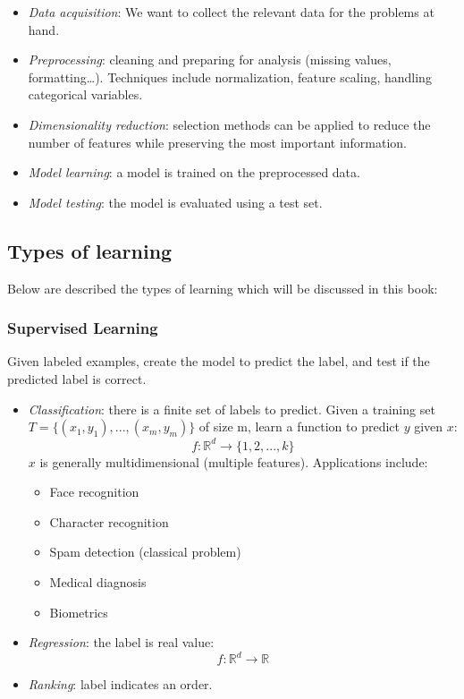 \documentclass[11pt]{article}
\begin{document}
\begin{itemize}
\tightlist
\item
  \emph{Data acquisition}: We want to collect the relevant data for the
  problems at hand.
\item
  \emph{Preprocessing}: cleaning and preparing for analysis (missing
  values, formatting\ldots). Techniques include normalization, feature
  scaling, handling categorical variables.
\item
  \emph{Dimensionality reduction}: selection methods can be applied to
  reduce the number of features while preserving the most important
  information.
\item
  \emph{Model learning}: a model is trained on the preprocessed data.
\item
  \emph{Model testing}: the model is evaluated using a test set.
\end{itemize}

\subsection{Types of learning}\label{types-of-learning}

Below are described the types of learning which will be discussed in
this book:

\subsubsection{Supervised Learning}\label{supervised-learning}

Given labeled examples, create the model to predict the label, and test
if the predicted label is correct.

\begin{itemize}
\tightlist
\item
  \emph{Classification}: there is a finite set of labels to predict.
  Given a training set \(T = \{(x_1,y_1),...,(x_m,y_m)\}\) of size m,
  learn a function to predict \(y\) given \(x\):
  \[f: \mathbb{R}^d \rightarrow \{1, 2, ..., k\}\] \(x\) is generally
  multidimensional (multiple features). Applications include:

  \begin{itemize}
  \tightlist
  \item
    Face recognition
  \item
    Character recognition
  \item
    Spam detection (classical problem)
  \item
    Medical diagnosis
  \item
    Biometrics
  \end{itemize}
\item
  \emph{Regression}: the label is real value:
  \[f: \mathbb{R}^d \rightarrow \mathbb{R}\]
\item
  \emph{Ranking}: label indicates an order.
\end{itemize}
\end{document}
